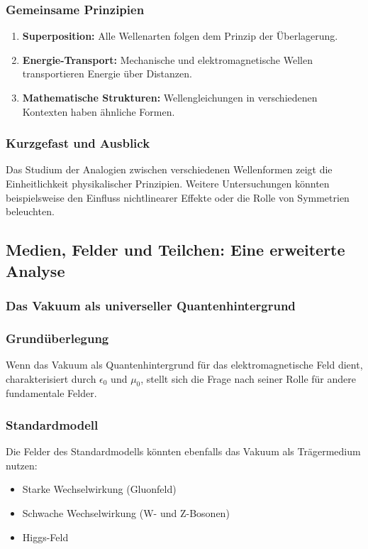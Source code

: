 \documentclass[12pt,a4paper]{article}
\begin{document}
	\subsubsection{Gemeinsame Prinzipien}
	
	\begin{enumerate}
		\item \textbf{Superposition:} Alle Wellenarten folgen dem Prinzip der Überlagerung.
		\item \textbf{Energie-Transport:} Mechanische und elektromagnetische Wellen transportieren Energie über Distanzen.
		\item \textbf{Mathematische Strukturen:} Wellengleichungen in verschiedenen Kontexten haben ähnliche Formen.
	\end{enumerate}
	
	\subsubsection{Kurzgefast und Ausblick}
	Das Studium der Analogien zwischen verschiedenen Wellenformen zeigt die Einheitlichkeit physikalischer Prinzipien. Weitere Untersuchungen könnten beispielsweise den Einfluss nichtlinearer Effekte oder die Rolle von Symmetrien beleuchten.
	
	
	
	\subsection{Medien, Felder und Teilchen: Eine erweiterte Analyse}
	
	\subsubsection{Das Vakuum als universeller Quantenhintergrund}
	
	\subsubsection{Grundüberlegung}
	Wenn das Vakuum als Quantenhintergrund für das elektromagnetische Feld dient, charakterisiert durch $\epsilon_0$ und $\mu_0$, stellt sich die Frage nach seiner Rolle für andere fundamentale Felder.
	
	\subsubsection{Standardmodell}
	Die Felder des Standardmodells könnten ebenfalls das Vakuum als Trägermedium nutzen:
	\begin{itemize}
		\item Starke Wechselwirkung (Gluonfeld)
		\item Schwache Wechselwirkung (W- und Z-Bosonen)
		\item Higgs-Feld
	\end{itemize}
	
\end{document}
